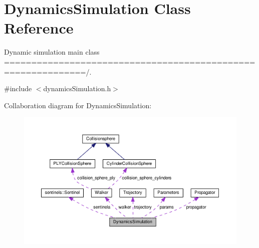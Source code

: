 \hypertarget{class_dynamics_simulation}{}\section{Dynamics\+Simulation Class Reference}
\label{class_dynamics_simulation}


Dynamic simulation main class =============================================================/.  




{\ttfamily \#include $<$dynamics\+Simulation.\+h$>$}



Collaboration diagram for Dynamics\+Simulation\+:
\nopagebreak
\begin{figure}[H]
\begin{center}
\leavevmode
\includegraphics[width=350pt]{class_dynamics_simulation__coll__graph}
\end{center}
\end{figure}
